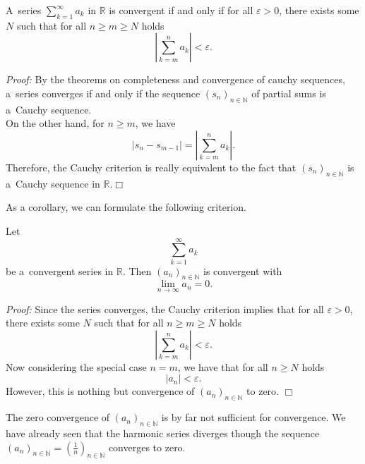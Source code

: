  

\begin{Theorem}
A~series $\displaystyle\sum_{k=1}^\infty a_k$ in $\mathbb{R}$ is convergent if and only if for all $\varepsilon>0$, there exists some $N$ such that for all $n\geq m\geq N$ holds
\[\left|\sum_{k=m}^n a_k\right|<\varepsilon.\]
\end{Theorem}

{\em Proof:} By the theorems on completeness and convergence of cauchy sequences, a~series converges if and only if the sequence $(s_{n})_{n\in\mathbb{N}}$ of partial sums is a~Cauchy sequence.\\
On the other hand, for $n\geq m$, we have
\[\left|s_n-s_{m-1}\right|=\left|\sum_{k=m}^n a_k\right|.\]
Therefore, the Cauchy criterion is really equivalent to the fact that $(s_{n})_{n\in\mathbb{N}}$ is a~Cauchy sequence in $\mathbb{R}$.\hfill$\Box$

As a corollary, we can formulate the following criterion.

\begin{Theorem}
\label{eq:conv0}
Let \[\sum_{k=1}^\infty a_k\] be a~convergent series in $\mathbb{R}$. Then $(a_n)_{n \in \mathbb{N}}$ is convergent with
\[\lim_{n\to\infty}a_n=0.\]
\end{Theorem}
{\em Proof:}
Since the series converges, the Cauchy criterion implies that for all $\varepsilon>0$, there exists some $N$ such that for all $n\geq m\geq N$ holds
\[\left|\sum_{k=m}^n a_k\right|<\varepsilon.\]
Now considering the special case $n=m$, we have that for all $n\geq N$ holds
\[|a_n|<\varepsilon.\]
However, this is nothing but convergence of $(a_n)_{n\in\mathbb{N}}$ to zero.
\hfill$\Box$
\begin{Remark}{}
The zero convergence of $(a_n)_{n\in\mathbb{N}}$ is by far not sufficient for convergence. We have already seen that the harmonic series diverges though the sequence $(a_n)_{n\in\mathbb{N}}=(\frac1n)_{n\in\mathbb{N}}$ converges to zero.
\end{Remark}

